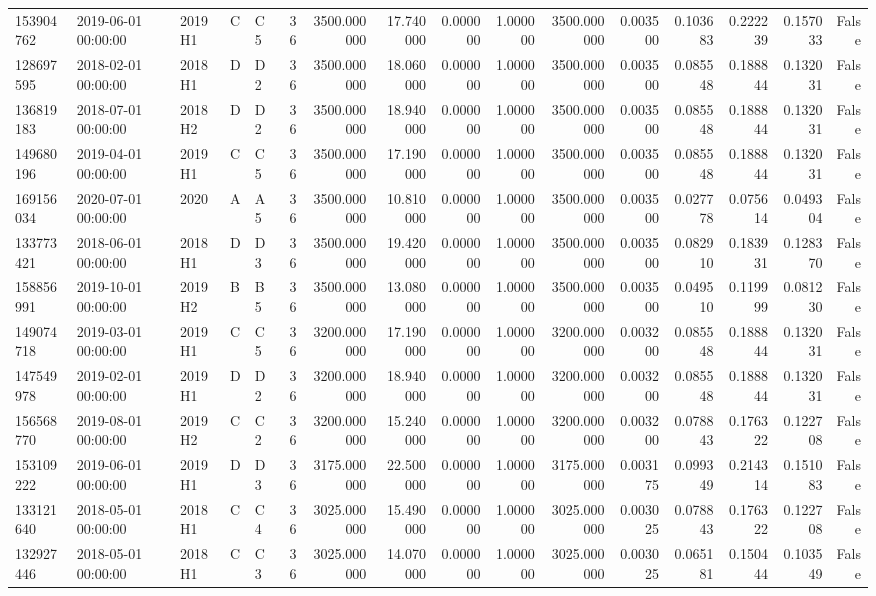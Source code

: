 \begin{tabular}{lllllrrrrrrrrrrr}
153904762 & 2019-06-01 00:00:00 & 2019H1 & C & C5 & 36 & 3500.000000 & 17.740000 & 0.000000 & 1.000000 & 3500.000000 & 0.003500 & 0.103683 & 0.222239 & 0.157033 & False \\
128697595 & 2018-02-01 00:00:00 & 2018H1 & D & D2 & 36 & 3500.000000 & 18.060000 & 0.000000 & 1.000000 & 3500.000000 & 0.003500 & 0.085548 & 0.188844 & 0.132031 & False \\
136819183 & 2018-07-01 00:00:00 & 2018H2 & D & D2 & 36 & 3500.000000 & 18.940000 & 0.000000 & 1.000000 & 3500.000000 & 0.003500 & 0.085548 & 0.188844 & 0.132031 & False \\
149680196 & 2019-04-01 00:00:00 & 2019H1 & C & C5 & 36 & 3500.000000 & 17.190000 & 0.000000 & 1.000000 & 3500.000000 & 0.003500 & 0.085548 & 0.188844 & 0.132031 & False \\
169156034 & 2020-07-01 00:00:00 & 2020 & A & A5 & 36 & 3500.000000 & 10.810000 & 0.000000 & 1.000000 & 3500.000000 & 0.003500 & 0.027778 & 0.075614 & 0.049304 & False \\
133773421 & 2018-06-01 00:00:00 & 2018H1 & D & D3 & 36 & 3500.000000 & 19.420000 & 0.000000 & 1.000000 & 3500.000000 & 0.003500 & 0.082910 & 0.183931 & 0.128370 & False \\
158856991 & 2019-10-01 00:00:00 & 2019H2 & B & B5 & 36 & 3500.000000 & 13.080000 & 0.000000 & 1.000000 & 3500.000000 & 0.003500 & 0.049510 & 0.119999 & 0.081230 & False \\
149074718 & 2019-03-01 00:00:00 & 2019H1 & C & C5 & 36 & 3200.000000 & 17.190000 & 0.000000 & 1.000000 & 3200.000000 & 0.003200 & 0.085548 & 0.188844 & 0.132031 & False \\
147549978 & 2019-02-01 00:00:00 & 2019H1 & D & D2 & 36 & 3200.000000 & 18.940000 & 0.000000 & 1.000000 & 3200.000000 & 0.003200 & 0.085548 & 0.188844 & 0.132031 & False \\
156568770 & 2019-08-01 00:00:00 & 2019H2 & C & C2 & 36 & 3200.000000 & 15.240000 & 0.000000 & 1.000000 & 3200.000000 & 0.003200 & 0.078843 & 0.176322 & 0.122708 & False \\
153109222 & 2019-06-01 00:00:00 & 2019H1 & D & D3 & 36 & 3175.000000 & 22.500000 & 0.000000 & 1.000000 & 3175.000000 & 0.003175 & 0.099349 & 0.214314 & 0.151083 & False \\
133121640 & 2018-05-01 00:00:00 & 2018H1 & C & C4 & 36 & 3025.000000 & 15.490000 & 0.000000 & 1.000000 & 3025.000000 & 0.003025 & 0.078843 & 0.176322 & 0.122708 & False \\
132927446 & 2018-05-01 00:00:00 & 2018H1 & C & C3 & 36 & 3025.000000 & 14.070000 & 0.000000 & 1.000000 & 3025.000000 & 0.003025 & 0.065181 & 0.150444 & 0.103549 & False \\

\end{tabular}
